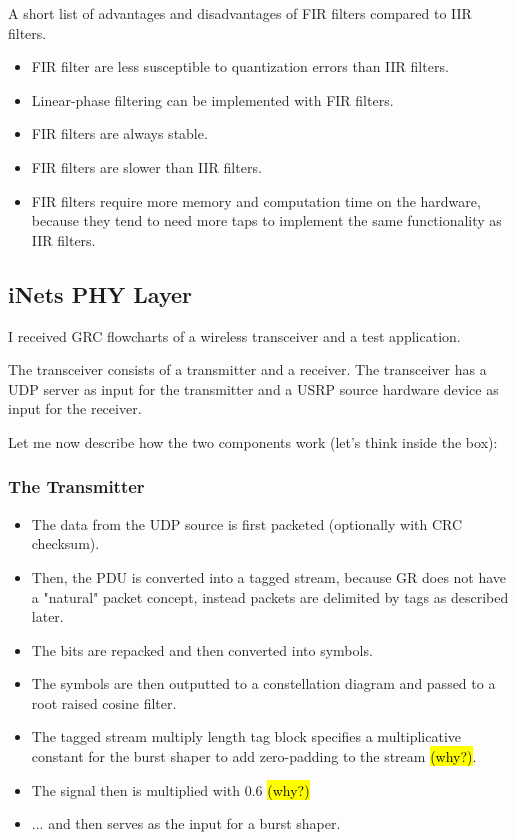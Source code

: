 \documentclass{article}
\begin{document}
A short list of advantages and disadvantages of FIR filters compared to IIR filters.
\begin{itemize}
	\item FIR filter are less susceptible to quantization errors than IIR filters. 
	\item Linear-phase filtering can be implemented with FIR filters.
	\item FIR filters are always stable.
	\item FIR filters are slower than IIR filters.
	\item FIR filters require more memory and computation time on the hardware, because they tend to need more taps to implement the same functionality as IIR filters.
	
\end{itemize}

\subsection{iNets PHY Layer}

I received GRC flowcharts of a wireless transceiver and a test application.

\bigskip

The transceiver consists of a transmitter and a receiver. The transceiver has a UDP server as input for the transmitter and a USRP source hardware device as input for the receiver. 

\bigskip

Let me now describe how the two components work (let's think inside the box):

\subsubsection{The Transmitter}

\begin{itemize}
	\item The data from the UDP source is first packeted (optionally with CRC checksum).
	\item Then, the PDU is converted into a tagged stream, because GR does not have a "natural" packet concept, instead packets are delimited by tags as described later.
	\item The bits are repacked and then converted into symbols.
	\item The symbols are then outputted to a constellation diagram and passed to a root raised cosine filter.
	\item The tagged stream multiply length tag block specifies a multiplicative constant for the burst shaper to add zero-padding to the stream \hl{(why?)}.
	\item The signal then is multiplied with 0.6 \hl{(why?)}
	\item ... and then serves as the input for a burst shaper.
\end{itemize}
\end{document}

